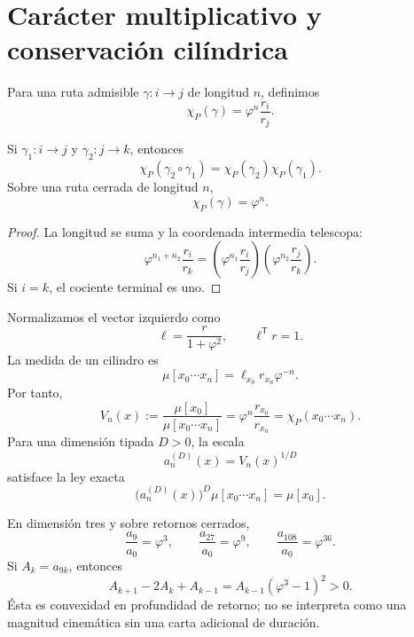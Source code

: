 \section{Carácter multiplicativo y conservación cilíndrica}

Para una ruta admisible \(\gamma:i\to j\) de longitud \(n\), definimos
\begin{equation}
 \chi_P(\gamma)=\varphi^n\frac{r_i}{r_j}.
 \label{gfp:b:eq:caracter-parry-phi}
\end{equation}

\begin{proposition}
\label{gfp:b:prop:multiplicatividad-parry-phi}
Si \(\gamma_1:i\to j\) y \(\gamma_2:j\to k\), entonces
\[
 \chi_P(\gamma_2\circ\gamma_1)
 =\chi_P(\gamma_2)\chi_P(\gamma_1).
\]
Sobre una ruta cerrada de longitud \(n\),
\[
 \chi_P(\gamma)=\varphi^n.
\]
\end{proposition}

\begin{proof}
La longitud se suma y la coordenada intermedia telescopa:
\[
 \varphi^{n_1+n_2}\frac{r_i}{r_k}
 =\left(\varphi^{n_1}\frac{r_i}{r_j}\right)
  \left(\varphi^{n_2}\frac{r_j}{r_k}\right).
\]
Si \(i=k\), el cociente terminal es uno.
\end{proof}

Normalizamos el vector izquierdo como
\[
 \ell=\frac{r}{1+\varphi^2},
 \qquad
 \ell^{\mathsf T}r=1.
\]
La medida de un cilindro es
\[
 \mu[x_0\cdots x_n]
 =\ell_{x_0}r_{x_n}\varphi^{-n}.
\]
Por tanto,
\begin{equation}
 V_n(x)
 :=\frac{\mu[x_0]}{\mu[x_0\cdots x_n]}
 =\varphi^n\frac{r_{x_0}}{r_{x_n}}
 =\chi_P(x_0\cdots x_n).
 \label{gfp:b:eq:volumen-cilindrico-phi}
\end{equation}
Para una dimensión tipada \(D>0\), la escala
\[
 a_n^{(D)}(x)=V_n(x)^{1/D}
\]
satisface la ley exacta
\begin{equation}
 \boxed{
 \bigl(a_n^{(D)}(x)\bigr)^D
 \mu[x_0\cdots x_n]=\mu[x_0].}
 \label{gfp:b:eq:conservacion-cilindrica-phi}
\end{equation}

En dimensión tres y sobre retornos cerrados,
\[
 \frac{a_9}{a_0}=\varphi^3,
 \qquad
 \frac{a_{27}}{a_0}=\varphi^9,
 \qquad
 \frac{a_{108}}{a_0}=\varphi^{36}.
\]
Si \(A_k=a_{9k}\), entonces
\begin{equation}
 A_{k+1}-2A_k+A_{k-1}
 =A_{k-1}(\varphi^3-1)^2>0.
 \label{gfp:b:eq:convexidad-retornos-phi}
\end{equation}
Ésta es convexidad en profundidad de retorno; no se interpreta como una
magnitud cinemática sin una carta adicional de duración.

